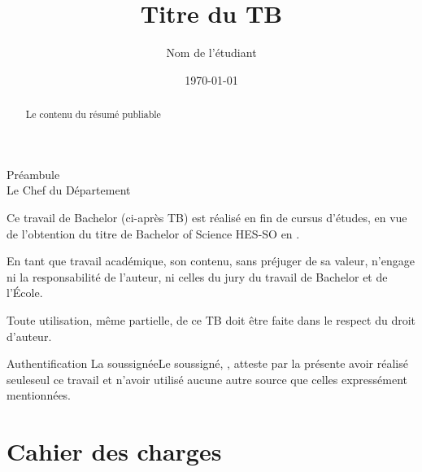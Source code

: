 \documentclass[a4paper,twoside,12pt,french]{heig-bachelor}
\title[short title]{Titre du TB}
\author[NÉ]{Nom de l'étudiant}
\date{\today}
\begin{document}
    \frontmatter
    \maketitle

    \begin{abstract}
        Le contenu du résumé publiable
    \end{abstract}

    \makeatletter %
    \begin{signedpage}{Préambule}{\@shortschool\\[0.5em] Le Chef du Département}{\@location}{\@date}

        Ce travail de Bachelor (ci-après TB) est réalisé en fin de cursus d’études, en vue de l’obtention du titre de Bachelor of Science HES-SO en \@bachelorof.

        En tant que travail académique, son contenu, sans préjuger de sa valeur, n'engage ni la responsabilité de l'auteur, ni celles du jury du travail de Bachelor et de l'École.

        Toute utilisation, même partielle, de ce TB doit être faite dans le respect du droit d’auteur.
    \end{signedpage}

    \begin{signedpage}{Authentification}{\@author}{\@location}{\@date}
        \if@authorgenderfem La soussignée\else Le soussigné\fi, \@author,
        atteste par la présente avoir réalisé
        \if@authorgenderfem seule\else seul\fi
        ce travail et n’avoir utilisé aucune autre source que celles expressément mentionnées.
    \end{signedpage}
    \makeatother

    \summary

    \mainmatter


    \chapter{Cahier des charges}
    
    


    \backmatter

    \tableofcontents
    \listoffigures
    \listoftables
    \printbibliography
    \printindex
\end{document}
